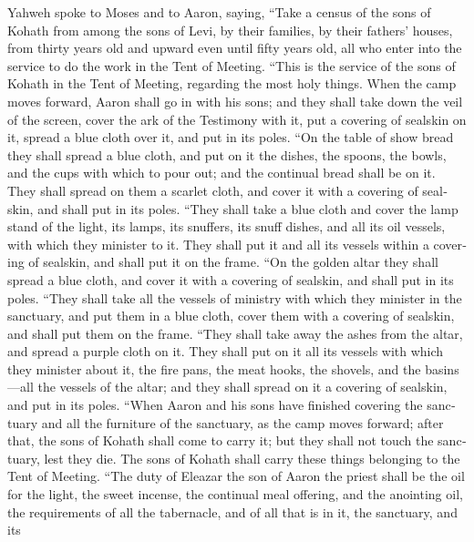 \begin{paracol}{2}
\begin{otherlanguage}{english}
 Yahweh spoke to Moses and to Aaron, saying,
 ``Take a census of the sons of Kohath from among the sons
of Levi, by their families, by their fathers' houses, 
from thirty years old and upward even until fifty years old, all who
enter into the service to do the work in the Tent of Meeting.
 ``This is the service of the sons of Kohath in the Tent
of Meeting, regarding the most holy things.  When the camp
moves forward, Aaron shall go in with his sons; and they shall take down
the veil of the screen, cover the ark of the Testimony with it,
 put a covering of sealskin on it, spread a blue cloth
over it, and put in its poles.  ``On the table of show
bread they shall spread a blue cloth, and put on it the dishes, the
spoons, the bowls, and the cups with which to pour out; and the
continual bread shall be on it.  They shall spread on them
a scarlet cloth, and cover it with a covering of sealskin, and shall put
in its poles.  ``They shall take a blue cloth and cover
the lamp stand of the light, its lamps, its snuffers, its snuff dishes,
and all its oil vessels, with which they minister to it. 
They shall put it and all its vessels within a covering of sealskin, and
shall put it on the frame.  ``On the golden altar they
shall spread a blue cloth, and cover it with a covering of sealskin, and
shall put in its poles.  ``They shall take all the
vessels of ministry with which they minister in the sanctuary, and put
them in a blue cloth, cover them with a covering of sealskin, and shall
put them on the frame.  ``They shall take away the ashes
from the altar, and spread a purple cloth on it.  They
shall put on it all its vessels with which they minister about it, the
fire pans, the meat hooks, the shovels, and the basins---all the vessels
of the altar; and they shall spread on it a covering of sealskin, and
put in its poles.  ``When Aaron and his sons have
finished covering the sanctuary and all the furniture of the sanctuary,
as the camp moves forward; after that, the sons of Kohath shall come to
carry it; but they shall not touch the sanctuary, lest they die. The
sons of Kohath shall carry these things belonging to the Tent of
Meeting.  ``The duty of Eleazar the son of Aaron the
priest shall be the oil for the light, the sweet incense, the continual
meal offering, and the anointing oil, the requirements of all the
tabernacle, and of all that is in it, the sanctuary, and its

\end{otherlanguage}
\end{paracol}
